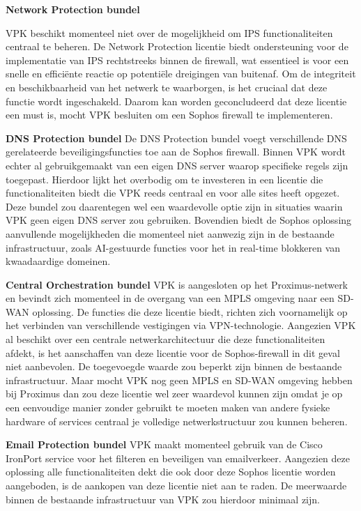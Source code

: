\textbf{Network Protection bundel}

VPK beschikt momenteel niet over de mogelijkheid om IPS functionaliteiten centraal te beheren. De Network Protection licentie biedt ondersteuning voor de implementatie van IPS rechtstreeks binnen de firewall, wat essentieel is voor een snelle en efficiënte reactie op potentiële dreigingen van buitenaf. Om de integriteit en beschikbaarheid van het netwerk te waarborgen, is het cruciaal dat deze functie wordt ingeschakeld. Daarom kan worden geconcludeerd dat deze licentie een must is, mocht VPK besluiten om een Sophos firewall te implementeren.


\textbf{DNS Protection bundel}
De DNS Protection bundel voegt verschillende DNS gerelateerde beveiligingsfuncties toe aan de Sophos firewall. Binnen VPK wordt echter al gebruikgemaakt van een eigen DNS server waarop specifieke regels zijn toegepast. Hierdoor lijkt het overbodig om te investeren in een licentie die functionaliteiten biedt die VPK reeds centraal en voor alle sites heeft opgezet. Deze bundel zou daarentegen wel een waardevolle optie zijn in situaties waarin VPK geen eigen DNS server zou gebruiken. Bovendien biedt de Sophos oplossing aanvullende mogelijkheden die momenteel niet aanwezig zijn in de bestaande infrastructuur, zoals AI-gestuurde functies voor het in real-time blokkeren van kwaadaardige domeinen.


\textbf{Central Orchestration bundel}
VPK is aangesloten op het Proximus-netwerk en bevindt zich momenteel in de overgang van een MPLS omgeving naar een SD-WAN oplossing. De functies die deze licentie biedt, richten zich voornamelijk op het verbinden van verschillende vestigingen via VPN-technologie. Aangezien VPK al beschikt over een centrale netwerkarchitectuur die deze functionaliteiten afdekt, is het aanschaffen van deze licentie voor de Sophos-firewall in dit geval niet aanbevolen. De toegevoegde waarde zou beperkt zijn binnen de bestaande infrastructuur. Maar mocht VPK nog geen MPLS en SD-WAN omgeving hebben bij Proximus dan zou deze licentie wel zeer waardevol kunnen zijn omdat je op een eenvoudige manier zonder gebruikt te moeten maken van andere fysieke hardware of services centraal je volledige netwerkstructuur zou kunnen beheren.


\textbf{Email Protection bundel}
VPK maakt momenteel gebruik van de Cisco IronPort service voor het filteren en beveiligen van emailverkeer. Aangezien deze oplossing alle functionaliteiten dekt die ook door deze Sophos licentie worden aangeboden, is de aankopen van deze licentie niet aan te raden. De meerwaarde binnen de bestaande infrastructuur van VPK zou hierdoor minimaal zijn.


